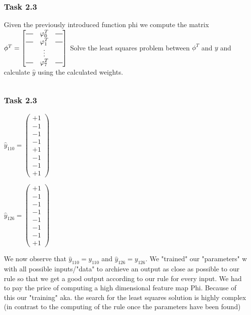 \documentclass[10pt,aspectratio=169,handout]{beamer}
\begin{document}
\begin{frame}
    \frametitle{Task 2.3}
    Given the previously introduced function phi we compute the matrix
    $\phi^T = \begin{bmatrix}
            \rule[.5ex]{2.5ex}{0.5pt} & \varphi^T_0 & \rule[.5ex]{2.5ex}{0.5pt} \\
            \rule[.5ex]{2.5ex}{0.5pt} & \varphi^T_1 & \rule[.5ex]{2.5ex}{0.5pt} \\
                                      & \vdots      &                           \\
            \rule[.5ex]{2.5ex}{0.5pt} & \varphi^T_7 & \rule[.5ex]{2.5ex}{0.5pt} \\
        \end{bmatrix}$
    Solve the least squares problem between $\phi^T$ and $y$ and calculate $\hat{y}$ using the calculated weights.
    \inputminted[bgcolor=LightGray,fontsize=\small]{python}{matrixphi.py}
\end{frame}

\begin{frame}
    \frametitle{Task 2.3}
    \begin{minipage}{0.45\textwidth}
        $\hat{y}_{110}= \begin{pmatrix}
                +1 \\
                -1 \\
                -1 \\
                -1 \\
                +1 \\
                -1 \\
                -1 \\
                +1
            \end{pmatrix}$
    \end{minipage}
    \begin{minipage}{0.45\textwidth}
        $\hat{y}_{126}= \begin{pmatrix}
                +1 \\
                -1 \\
                -1 \\
                -1 \\
                -1 \\
                -1 \\
                -1 \\
                +1
            \end{pmatrix}$
    \end{minipage}
    
    \vspace{1cm}
    We now observe that $\hat{y}_{110}=y_{110}$ and $\hat{y}_{126}=y_{126}$.
    We "trained" our "parameters" w with all possible inputs/"data" to archieve an output as close as possible to our rule so that we get a good output according to our rule for every input. We had to pay the price of computing a high dimensional feature map Phi. Because of this our "training" aka. the search for the least squares solution is highly complex (in contrast to the computing of the rule once the parameters have been found)
\end{frame}
\end{document}
